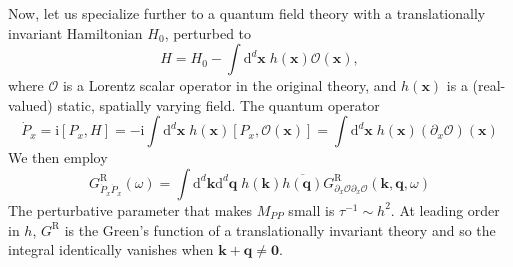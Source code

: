 \documentclass[10pt, oneside]{book}
\begin{document}
\begin{doublespace}
Now, let us specialize further to a quantum field theory with a translationally invariant Hamiltonian $H_0$, perturbed to \begin{equation}
H = H_0 - \int \mathrm{d}^d\mathbf{x} \; h(\mathbf{x}) \mathcal{O}(\mathbf{x}),  \label{ham}
\end{equation}where $\mathcal{O}$ is a Lorentz scalar operator in the original theory, and $h(\mathbf{x})$ is a (real-valued) static, spatially varying field.  The quantum operator \begin{equation}
\dot{P}_x  = \mathrm{i}[P_x, H] = -\mathrm{i}\int\mathrm{d}^d\mathbf{x} \; h(\mathbf{x}) [P_x,\mathcal{O}(\mathbf{x})] =  \int \mathrm{d}^d\mathbf{x}  \; h(\mathbf{x}) (\partial_x\mathcal{O})(\mathbf{x})
\end{equation}
  We then employ \begin{equation}
G^{\mathrm{R}}_{\dot{P}_x\dot{P}_x}(\omega) = \int \mathrm{d}^d\mathbf{k}\mathrm{d}^d\mathbf{q} \;  h(\mathbf{k})\overline{h(\mathbf{q})}  G^{\mathrm{R}}_{\partial_x \mathcal{O} \partial_x\mathcal{O}}(\mathbf{k},\mathbf{q},\omega) 
 \end{equation}The perturbative parameter that makes $M_{PP}$ small is $\tau^{-1}\sim h^2$.  At leading order in $h$, $G^{\mathrm{R}}$ is the Green's function of a translationally invariant theory and so the integral identically vanishes when $\mathbf{k}+ \mathbf{q} \ne \mathbf{0}$.    
 

\end{doublespace}
\end{document}
